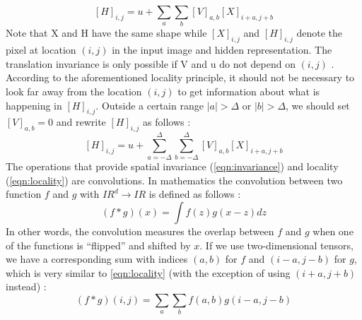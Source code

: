 \documentclass[12pt,a4paper]{scrartcl}
\begin{document}
\begin{equation}
\label{eqn:invariance}
[H]_{i,j} = u + \sum_a\sum_b[V]_{a,b}[X]_{i+a,j+b}
\end{equation}
Note that X and H have the same shape while \([X]_{i,j}\) and \([H]_{i,j}\) denote the pixel at location \((i, j)\) in the input image and hidden representation. The translation invariance is only possible if V and u do not depend on \((i, j)\) \cite{DIDLBook}.
According to the aforementioned locality principle, it should not be necessary to look far away from the location \((i, j)\) to get information about what is happening in \([H]_{i,j}\). Outside a certain range \(|a| > \Delta \) or \(|b| > \Delta\), we should set  \([V]_{a,b} = 0\) and rewrite \([H]_{i,j}\) as follows \cite{DIDLBook}:
\begin{equation}
\label{eqn:locality}
[H]_{i,j} = u + \sum_{a=-\Delta}^{\Delta}\sum_{b=-\Delta}^{\Delta}[V]_{a,b}[X]_{i+a,j+b}
\end{equation}
The operations that provide spatial invariance (\ref{eqn:invariance}) and locality (\ref{eqn:locality}) are convolutions. In mathematics the convolution between two function \(f\) and \(g\) with \({ I\!R}^d \rightarrow { I\!R}\) is defined as follows \cite{DIDLBook}: 
\begin{equation}
(f*g)(x) = \int f(z)g(x-z)dz
\end{equation}
In other words, the convolution measures the overlap between \(f\) and \(g\) when one of the functions is “flipped” and shifted by \(x\). If we use two-dimensional tensors, we have a corresponding sum with indices \((a, b)\) for \(f\) and \((i-a, j-b)\) for \(g\), which is very similar to \ref{eqn:locality} (with the exception of using \((i+a, j+b)\) instead) \cite{DIDLBook}:
\begin{equation}
(f*g)(i,j) = \sum_{a}\sum_{b} f(a,b)g(i-a,j-b)
\end{equation}
\end{document}
